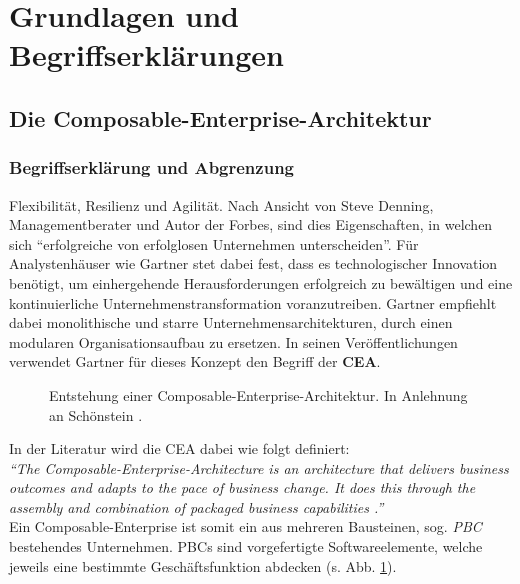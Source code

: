 \section{Grundlagen und Begriffserklärungen}

\subsection{Die Composable-Enterprise-Architektur}

\subsubsection{Begriffserklärung und Abgrenzung}
\label{sec:CEA_B}
Flexibilität, Resilienz und Agilität. Nach Ansicht von Steve Denning, Managementberater und Autor der Forbes, sind dies Eigenschaften, in welchen sich \enquote{erfolgreiche von erfolglosen Unternehmen unterscheiden}. Für Analystenhäuser wie Gartner stet dabei fest, dass es technologischer Innovation benötigt, um einhergehende Herausforderungen erfolgreich zu bewältigen und eine kontinuierliche Unternehmenstransformation voranzutreiben. Gartner empfiehlt dabei monolithische und starre Unternehmensarchitekturen, durch einen modularen Organisationsaufbau zu ersetzen. In seinen Veröffentlichungen verwendet Gartner für dieses Konzept den Begriff der \textbf{\ac{CEA}}.
\begin{center}
	\begin{figure}[H]
		\centering
		\caption[Entstehung einer Composable-Enterprise-Architektur]{Entstehung einer Composable-Enterprise-Architektur. In Anlehnung an Schönstein \cite{Schonenstein.20230103}.}
		\label{fig:CEA}
	\end{figure}	
\end{center}
\vspace*{-15mm}
In der Literatur wird die CEA dabei wie folgt definiert:\vspace{2mm}\\
\textit{\enquote{The Composable-Enterprise-Architecture is an architecture that delivers business outcomes and adapts to the pace of business change. It does this through the assembly and combination of packaged business capabilities \cite{.20230313}.}}\vspace{2mm}\\
Ein Composable-Enterprise ist somit ein aus mehreren Bausteinen, sog. \textit{\ac{PBC}} bestehendes Unternehmen. PBCs sind vorgefertigte Softwareelemente, welche jeweils eine bestimmte Geschäftsfunktion abdecken (s. Abb. \ref{fig:CEA}).
